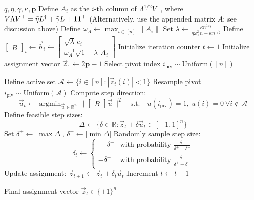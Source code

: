 \documentclass[12pt]{article}
\theoremstyle{definition}
\numberwithin{equation}{section}
\numberwithin{figure}{section}
\newcommand{\mat}[1]{\begin{bmatrix} #1 \end{bmatrix}}
\newcommand{\gsM}{\mat{B}}
\newcommand{\gscv}[1]{\vec{b}_{#1}}
\newcommand{\alive}{\mathcal{A}}
\newcommand{\gsvsym}{z}
\newcommand{\gsv}[1]{\vec{\gsvsym}_{#1}}
\newcommand{\gsvt}{\gsv{t}}
\newcommand{\gsve}[2]{\gsv{#1}(#2)}
\newcommand{\gsusym}{u}
\newcommand{\gsuv}[1]{\vec{\gsusym}_{#1}}
\newcommand{\gsuvt}{\gsuv{t}}
\newcommand{\gsun}[1]{\gsusym({#1})}
\newcommand{\gsdsym}{\delta}
\newcommand{\gsd}[1]{\gsdsym_{#1}}
\newcommand{\gsdn}{\gsdsym}
\newcommand{\gsdnp}{\gsdsym^+}
\newcommand{\gsdnm}{\gsdsym^-}
\newcommand{\gsdt}{\gsd{t}}
\DeclareMathOperator*{\argmin}{argmin}
\numberwithin{equation}{section}
\numberwithin{figure}{section}
\begin{document}
\begin{algorithm}[!h]
    \caption{(Adapted) Gram-Schmidt Walk (adaptation of \citet{harshaw2024balancing}; see also )}
    \label{alg:gramschmidt}
    \begin{algorithmic}[1] %
        \Require $q, \eta, \gamma, \kappa, \mathbf{p}$
        \State Define $A_i$ as the $i$-th column of $\Lambda^{1/2} V^\top$, where $V \Lambda V^\top = \Tilde{\eta} L^\dagger + \Tilde{\gamma}L + \mathbf{1}\mathbf{1}^\top$
        \Statex \hfill (Alternatively, use the appended matrix $A$; see discussion above)
        \State Define $\omega_A \gets \max_{i \in [n]} \|A_i\|$
        \State Set $\lambda \gets \frac{\kappa n^{1/{q}}} {\eta\omega_A^2 n + \kappa n^{1/q}}$ \label{line:adapt}
        \State Define $\mat{B}_i \gets \gscv{i} \gets 
            \begin{bmatrix}
                \sqrt{\lambda} \, e_i \\
                \omega_A^{-1} \sqrt{1 - \lambda} \, A_i
            \end{bmatrix}$
        \State Initialize iteration counter $t \gets 1$
        \State Initialize assignment vector $\gsv{1} \gets 2\mathbf{p} -1$ \label{line:initialize}
        \State Select pivot index $i_{\text{piv}} \sim \mathrm{Uniform}([n])$
        
        \While{$\gsvt \notin \{\pm 1\}^n$}
            \State Define active set $\alive \gets \{ i \in [n] : |\gsve{t}{i}| < 1 \}$
            \If{$i_{\text{piv}} \notin \alive$}
                \State Resample pivot $i_{\text{piv}} \sim \mathrm{Uniform}(\alive)$
            \EndIf
            \State Compute step direction:
            \[
            \gsuvt \gets \argmin_{\gsuv{} \in \mathbb{R}^n} \| \gsM \gsuv{} \|^2 \quad
            \text{s.t.} \quad \gsun{i_{\text{piv}}} = 1,\ \gsun{i} = 0\ \forall i \notin \alive
            \]
            \State Define feasible step sizes:
            \[
                \Delta \gets \{ \gsdn \in \mathbb{R} : \gsvt + \gsdn \gsuvt \in [-1, 1]^n \}
            \]
            \State Set $\gsdnp \gets |\max \Delta|$, $\gsdnm \gets |\min \Delta|$
            \State Randomly sample step size:
            \[
            \gsdt \gets 
            \begin{cases}
                \phantom{-}\gsdnp & \text{with probability } \frac{\gsdnm}{\gsdnp + \gsdnm} \\
                -\gsdnm & \text{with probability } \frac{\gsdnp}{\gsdnp + \gsdnm}
            \end{cases}
            \]
            \State Update assignment: $\gsv{t+1} \gets \gsvt + \gsdt \gsuvt$
            \State Increment $t \gets t + 1$
        \EndWhile
        
        \State \Return Final assignment vector $\gsvt \in \{\pm 1\}^n$
    \end{algorithmic}
\end{algorithm}
\end{document}
